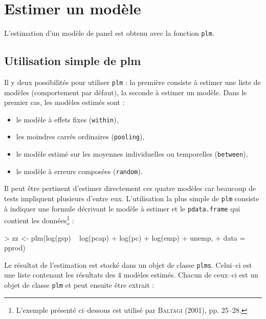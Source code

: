 \documentclass[a4paper]{article}
\begin{document}
\section{Estimer un modèle}

L'estimation d'un modèle de panel est obtenu avec la fonction
\texttt{plm}.


\subsection{Utilisation simple de plm}

Il y deux possibilités pour utiliser \texttt{plm} : la première
consiste à estimer une liste de modèles (comportement par défaut), la
seconde à estimer un modèle. Dans le premier cas, les modèles estimés
sont :

\begin{itemize}
\item le modèle à effets fixes (\texttt{within}),
\item les moindres carrés ordinaires (\texttt{pooling}),
\item le modèle estimé sur les moyennes individuelles ou temporelles (\texttt{between}),
\item le modèle à erreurs composées (\texttt{random}).
\end{itemize}

Il peut être pertinent d'estimer directement ces quatre modèles car
beaucoup de tests impliquent plusieurs d'entre eux. L'utilisation
la plus simple de \texttt{plm} consiste à indiquer une formule
décrivant le modèle à estimer et le \texttt{pdata.frame} qui contient
les données\footnote{L'exemple présenté ci--dessous est utilisé par  \textsc{Baltagi} (2001), pp. 25--28.} :

\begin{Schunk}
\begin{Sinput}
> zz <- plm(log(gsp) ~ log(pcap) + log(pc) + log(emp) + unemp, 
+     data = pprod)
\end{Sinput}
\end{Schunk}

Le résultat de l'estimation est stocké dans un objet de classe
\texttt{plms}. Celui--ci est une liste contenant les résultats des 4
modèles estimés. Chacun de ceux--ci est un objet de classe
\texttt{plm} et  peut ensuite être extrait :

\begin{Schunk}
\end{Schunk}
\end{document}
